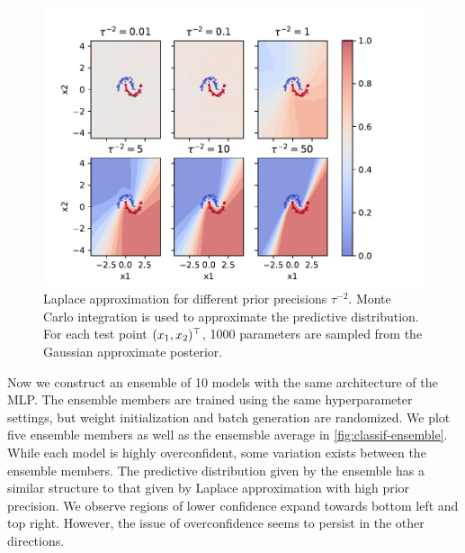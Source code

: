 \begin{figure}[tb]
  \centering
  \includegraphics{images/classif_laplace.pdf}
  \caption{Laplace approximation for different prior precisions $\tau^{-2}$. Monte Carlo integration is used to approximate the predictive distribution. For each test point $(x_1, x_2)^\top$, 1000 parameters are sampled from the Gaussian approximate posterior.}
  \label{fig:classif-la}
\end{figure}

Now we construct an ensemble of 10 models with the same architecture of the MLP. The ensemble members are trained using the same hyperparameter settings, but weight initialization and batch generation are randomized. We plot five ensemble members as well as the ensemsble average in \cref{fig:classif-ensemble}. While each model is highly overconfident, some variation exists between the ensemble members. The predictive distribution given by the ensemble has a similar structure to that given by Laplace approximation with high prior precision. We observe regions of lower confidence expand towards bottom left and top right. However, the issue of overconfidence seems to persist in the other directions.

